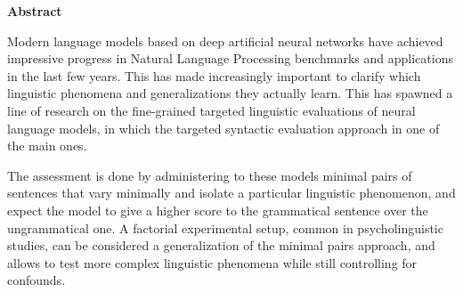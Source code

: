 \thispagestyle{plain}
\begin{center}
	\Large
	\vspace{1.8cm}
    \textbf{Abstract}
    	\vspace{0.9cm}
\end{center}

\normalsize
Modern language models based on deep artificial neural networks have achieved impressive progress in Natural Language Processing benchmarks and applications in the last few years. This has made increasingly important to clarify which linguistic phenomena and generalizations they actually learn. This has spawned a line of research on the fine-grained targeted linguistic evaluations of neural language models, in which the targeted syntactic evaluation approach in one of the main ones.

The assessment is done by administering to these models minimal pairs of sentences that vary minimally and isolate a particular linguistic phenomenon, and expect the model to give a higher score to the grammatical sentence over the ungrammatical one. A factorial experimental setup, common in psycholinguistic studies, can be considered a generalization of the minimal pairs approach, and allows to test more complex linguistic phenomena while still controlling for confounds.


% 


